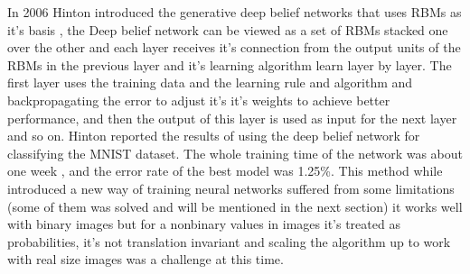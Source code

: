 \documentclass[12pt,twoside]{article}
\theoremstyle{plain}
\theoremstyle{definition}
\theoremstyle{remark}
\begin{document}
In 2006 Hinton \cite{Hinton2006D} introduced the generative deep belief networks that uses RBMs as it's basis , the Deep belief network can be viewed as a set of RBMs stacked one over the other and each layer receives it's connection from the output units of the RBMs in the previous layer and it's learning algorithm learn layer by layer. The first layer uses the training data and the learning rule and algorithm and backpropagating the error to adjust it's it's weights to achieve better performance, and then the output of this layer is used as input for the next layer and so on. Hinton reported \cite{Hinton2006D} the results of using the deep belief network for classifying the MNIST dataset. The whole training time of the network was about one week , and the error rate of the best model was 1.25\%. This method while introduced a new way of training neural networks suffered from some limitations (some of them was solved and will be mentioned in the next section) it works well with binary images but for a nonbinary values in images it's treated as probabilities, it's not translation invariant \cite{Lee2009} and scaling the algorithm up to work with real size images was a challenge at this time. 
\end{document}
